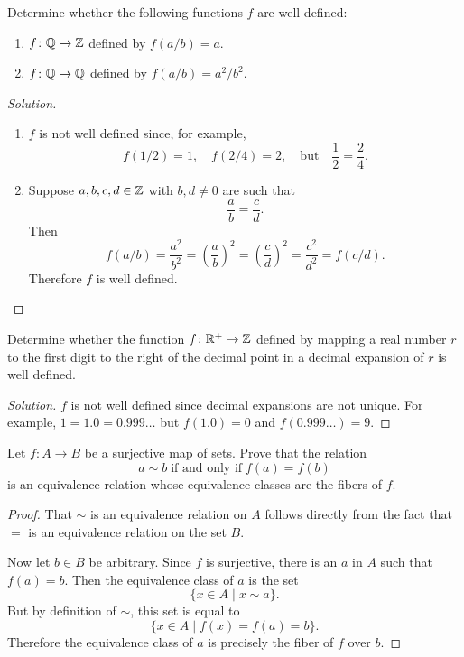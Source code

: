  Determine whether the following functions $f$ are well
defined:
\begin{enumerate}
\item
  $f\colon\mathbb{Q}\to\mathbb{Z}$ defined by $f(a/b) = a$.

\item
  $f\colon\mathbb{Q}\to\mathbb{Q}$ defined by $f(a/b) = a^2/b^2$.
\end{enumerate}
\begin{proof}[Solution]
  \begin{enumerate}
  \item
    $f$ is not well defined since, for example,
    \begin{equation*}
      f(1/2) = 1, \quad f(2/4) = 2, \quad\text{but}\quad\frac12 = \frac24.
    \end{equation*}

  \item
    Suppose $a,b,c,d\in\mathbb{Z}$ with $b, d\neq 0$ are such that
    \begin{equation*}
      \frac{a}{b} = \frac{c}{d}.
    \end{equation*}
    Then
    \begin{equation*}
      f(a/b) = \frac{a^2}{b^2} = \left(\frac ab\right)^2
      = \left(\frac cd\right)^2 = \frac{c^2}{d^2} = f(c/d).
    \end{equation*}
    Therefore $f$ is well defined.
  \end{enumerate}
\end{proof}

 Determine whether the function $f\colon\mathbb{R}^+\to\mathbb{Z}$ defined
by mapping a real number $r$ to the first digit to the right of the
decimal point in a decimal expansion of $r$ is well defined.
\begin{proof}[Solution]
  $f$ is not well defined since decimal expansions are not unique. For
  example, $1 = 1.0 = 0.999\ldots$ but $f(1.0) = 0$ and
  $f(0.999\ldots) = 9$.
\end{proof}

 Let $f\colon A\to B$ be a surjective map of sets. Prove
that the relation
\begin{equation*}
  a\sim b \;\text{if and only if}\; f(a) = f(b)
\end{equation*}
is an equivalence relation whose equivalence classes are the fibers of
$f$.
\begin{proof}
  That $\sim$ is an equivalence relation on $A$ follows directly from
  the fact that $=$ is an equivalence relation on the set $B$.

  Now let $b\in B$ be arbitrary. Since $f$ is surjective, there is an
  $a$ in $A$ such that $f(a) = b$. Then the equivalence class of $a$
  is the set
  \begin{equation*}
    \{ x\in A \mid x\sim a \}.
  \end{equation*}
  But by definition of $\sim$, this set is equal to
  \begin{equation*}
    \{ x\in A \mid f(x) = f(a) = b \}.
  \end{equation*}
  Therefore the equivalence class of $a$ is precisely the fiber of $f$
  over $b$.
\end{proof}
